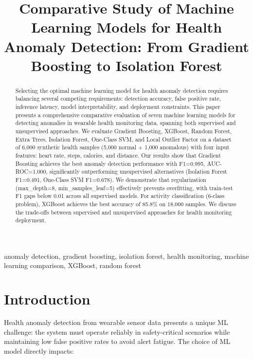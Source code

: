 \documentclass[conference]{IEEEtran}
\begin{document}
\title{Comparative Study of Machine Learning Models for Health Anomaly Detection: From Gradient Boosting to Isolation Forest}

\author{
}

\maketitle

\begin{abstract}
Selecting the optimal machine learning model for health anomaly detection requires balancing several competing requirements: detection accuracy, false positive rate, inference latency, model interpretability, and deployment constraints. This paper presents a comprehensive comparative evaluation of seven machine learning models for detecting anomalies in wearable health monitoring data, spanning both supervised and unsupervised approaches. We evaluate Gradient Boosting, XGBoost, Random Forest, Extra Trees, Isolation Forest, One-Class SVM, and Local Outlier Factor on a dataset of 6,000 synthetic health samples (5,000 normal + 1,000 anomalous) with four input features: heart rate, steps, calories, and distance. Our results show that Gradient Boosting achieves the best anomaly detection performance with F1=0.995, AUC-ROC=1.000, significantly outperforming unsupervised alternatives (Isolation Forest F1=0.491, One-Class SVM F1=0.678). We demonstrate that regularization (max\_depth=8, min\_samples\_leaf=5) effectively prevents overfitting, with train-test F1 gaps below 0.01 across all supervised models. For activity classification (6-class problem), XGBoost achieves the best accuracy of 85.8\% on 18,000 samples. We discuss the trade-offs between supervised and unsupervised approaches for health monitoring deployment.
\end{abstract}

\begin{IEEEkeywords}
anomaly detection, gradient boosting, isolation forest, health monitoring, machine learning comparison, XGBoost, random forest
\end{IEEEkeywords}

\section{Introduction}
Health anomaly detection from wearable sensor data presents a unique ML challenge: the system must operate reliably in safety-critical scenarios while maintaining low false positive rates to avoid alert fatigue. The choice of ML model directly impacts:
\end{document}
